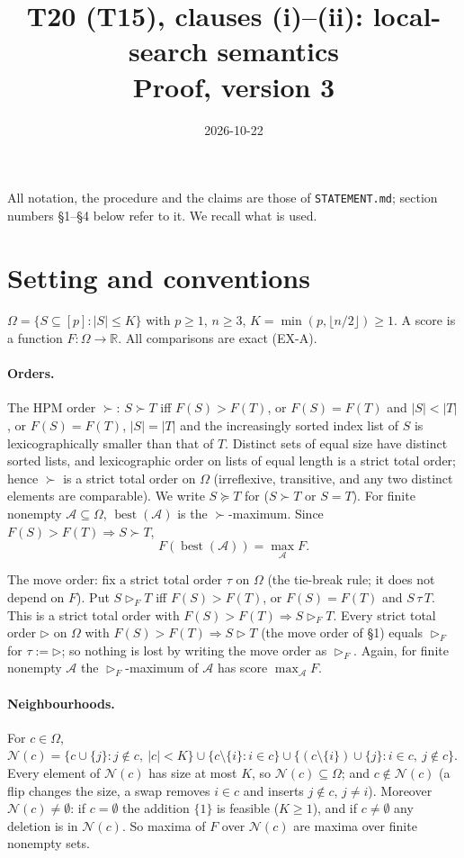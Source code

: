 \documentclass[11pt]{article}
\title{T20 (T15), clauses (i)--(ii): local-search semantics\\ \large Proof, version 3}
\date{2026-10-22}
\theoremstyle{remark}
\newcommand{\cN}{\mathcal{N}}
\newcommand{\best}{\operatorname{best}}
\begin{document}
\maketitle

All notation, the procedure and the claims are those of \texttt{STATEMENT.md}; section numbers \S1--\S4 below refer to it. We recall what is used.

\section{Setting and conventions}

$\Omega=\{S\subseteq[p]:|S|\le K\}$ with $p\ge1$, $n\ge3$, $K=\min(p,\lfloor n/2\rfloor)\ge1$. A score is a function $F:\Omega\to\mathbb{R}$. All comparisons are exact (EX-A).

\paragraph{Orders.} The HPM order $\succ$: $S\succ T$ iff $F(S)>F(T)$, or $F(S)=F(T)$ and $|S|<|T|$, or $F(S)=F(T)$, $|S|=|T|$ and the increasingly sorted index list of $S$ is lexicographically smaller than that of $T$. Distinct sets of equal size have distinct sorted lists, and lexicographic order on lists of equal length is a strict total order; hence $\succ$ is a strict total order on $\Omega$ (irreflexive, transitive, and any two distinct elements are comparable). We write $S\succeq T$ for ($S\succ T$ or $S=T$). For finite nonempty $\mathcal A\subseteq\Omega$, $\best(\mathcal A)$ is the $\succ$-maximum. Since $F(S)>F(T)\Rightarrow S\succ T$,
\begin{equation}\label{eq:bestmax}
F(\best(\mathcal A))=\max_{\mathcal A}F .
\end{equation}

The move order: fix a strict total order $\tau$ on $\Omega$ (the tie-break rule; it does not depend on $F$). Put $S\rhd_F T$ iff $F(S)>F(T)$, or $F(S)=F(T)$ and $S\,\tau\,T$. This is a strict total order with $F(S)>F(T)\Rightarrow S\rhd_F T$. Every strict total order $\rhd$ on $\Omega$ with $F(S)>F(T)\Rightarrow S\rhd T$ (the move order of \S1) equals $\rhd_F$ for $\tau:=\rhd$; so nothing is lost by writing the move order as $\rhd_F$. Again, for finite nonempty $\mathcal A$ the $\rhd_F$-maximum of $\mathcal A$ has score $\max_{\mathcal A}F$.

\paragraph{Neighbourhoods.} For $c\in\Omega$,
$\cN(c)=\{c\cup\{j\}:j\notin c,\ |c|<K\}\cup\{c\setminus\{i\}:i\in c\}\cup\{(c\setminus\{i\})\cup\{j\}:i\in c,\ j\notin c\}$.
Every element of $\cN(c)$ has size at most $K$, so $\cN(c)\subseteq\Omega$; and $c\notin\cN(c)$ (a flip changes the size, a swap removes $i\in c$ and inserts $j\notin c$, $j\ne i$). Moreover $\cN(c)\ne\emptyset$: if $c=\emptyset$ the addition $\{1\}$ is feasible ($K\ge1$), and if $c\ne\emptyset$ any deletion is in $\cN(c)$. So maxima of $F$ over $\cN(c)$ are maxima over finite nonempty sets.
\end{document}
